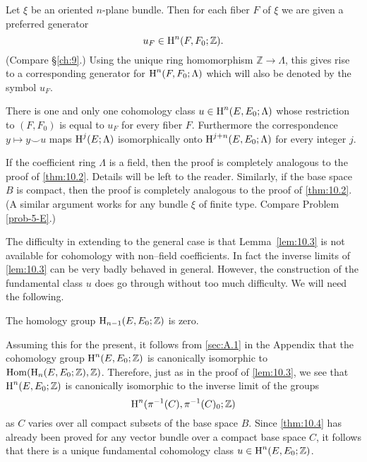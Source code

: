 \documentclass[../main]{subfiles}
\begin{document}
Let $\xi$ be an oriented $n$-plane bundle. Then for each fiber $F$ of $\xi$ we are given a preferred generator \[u_F \in \operatorname{H}^n(F, F_0; \mathbb Z). \] (Compare \S\ref{ch:9}.) Using the unique ring homomorphism $\mathbb Z \longrightarrow \Lambda$, this gives rise to a corresponding generator for $\operatorname{H}^n(F, F_0; \Lambda)$ which will also be denoted by the symbol $u_F$. 
\begin{theorem}
\label{thm:10.4}
There is one and only one cohomology class $u \in \operatorname{H}^n(E, E_0; \Lambda)$ whose restriction to $(F, F_0)$ is equal to $u_F$ for every fiber $F$. Furthermore the correspondence $y \mapsto y \smile u$ maps $\operatorname{H}^j(E; \Lambda)$ isomorphically onto $\operatorname{H}^{j + n}(E, E_0; \Lambda)$ for every integer $j$. 
\end{theorem}
If the coefficient ring $\Lambda$ is a field, then the proof is completely analogous to the proof of \ref{thm:10.2}. Details will be left to the reader. Similarly, if the base space $B$ is compact, then the proof is completely analogous to the proof of \ref{thm:10.2}. (A similar argument works for any bundle $\xi$ of finite type. Compare Problem \ref{prob-5-E}.) 

The difficulty in extending to the general case is that Lemma~\ref{lem:10.3} is not available for cohomology with non--field coefficients. In fact the inverse limits of \ref{lem:10.3} can be very badly behaved in general. However, the construction of the fundamental class $u$ does go through without too much difficulty. We will need the following.

\begin{lemma}
\label{lem:10.5}
The homology group $\operatorname{H}_{n - 1}(E, E_0; \mathbb Z)$ is zero.
\end{lemma}

Assuming this for the present, it follows from \ref{sec:A.1} in the Appendix that the cohomology group $\operatorname{H}^n(E, E_0; \mathbb Z)$ is canonically isomorphic to $\operatorname{Hom}(\operatorname{H}_n(E, E_0; \mathbb Z), \mathbb Z)$. Therefore, just as in the proof of \ref{lem:10.3}, we see that $\operatorname{H}^n(E, E_0; \mathbb Z)$ is canonically isomorphic to the inverse limit of the groups \[\operatorname{H}^n(\pi^{-1}(C), \pi^{-1}(C)_0; \mathbb Z)\] as $C$ varies over all compact subsets of the base space $B$. Since \ref{thm:10.4} has already been proved for any vector bundle over a compact base space $C$, it follows that there is a unique fundamental cohomology class $u \in \operatorname{H}^n(E, E_0; \mathbb Z)$. 
\end{document}
